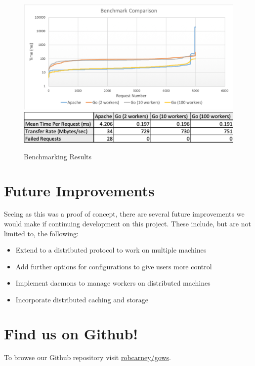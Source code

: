 \documentclass[10pt]{article}
\begin{document}
\begin{figure}[h]
\centering
        \includegraphics[width=16cm]{./images/graph.png}
        \includegraphics[width=16cm]{./images/table.png}
        \caption{Benchmarking Results}
\end{figure}
\pagebreak
\begin{multicols*}{2}
\section*{Future Improvements}
\par
Seeing as this was a proof of concept, there are several future improvements we would make if continuing development on this project. These include, but are not limited to, the following:
\begin{itemize}
\item
Extend to a distributed protocol to work on multiple machines
\item
Add further options for configurations to give users more control
\item
Implement daemons to manage workers on distributed machines
\item
Incorporate distributed caching and storage
\end{itemize}
\section*{Find us on Github!}
\par
To browse our Github repository visit \href{https://github.com/robcarney/gows}{robcarney/gows}.
\end{multicols*}
\end{document}
